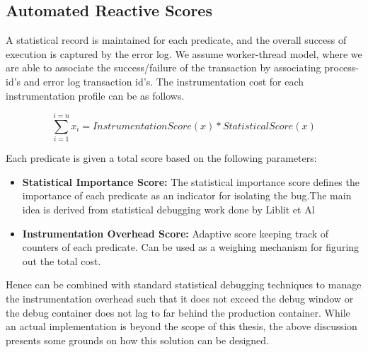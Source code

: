 \subsection{Automated Reactive Scores}

A statistical record is maintained for each predicate, and the overall success of execution is captured by the error log.
We assume worker-thread model, where we are able to associate the success/failure of the transaction by associating process-id’s and error log transaction id’s.
The instrumentation cost for each instrumentation profile can be as follows.

\begin{equation}
\sum\limits_{i=1}^{i=n} x_i  = InstrumentationScore(x)*StatisticalScore(x)
\end{equation}

Each predicate is given a total score based on the following parameters:

\begin{itemize}
	\item \textbf{Statistical Importance Score:} The statistical importance score defines the importance of each predicate as an indicator for isolating the bug.The main idea is derived from statistical debugging work done by Liblit et Al
	\item \textbf{Instrumentation Overhead Score:} Adaptive score keeping track of counters of each predicate. Can be used as a weighing mechanism for figuring out the total cost.
\end{itemize}

Hence \parikshan can be combined with standard statistical debugging techniques to manage the instrumentation overhead such that it does not exceed the debug window or the debug container does not lag to far behind the production container.
While an actual implementation is beyond the scope of this thesis, the above discussion presents some grounds on how this solution can be designed.

